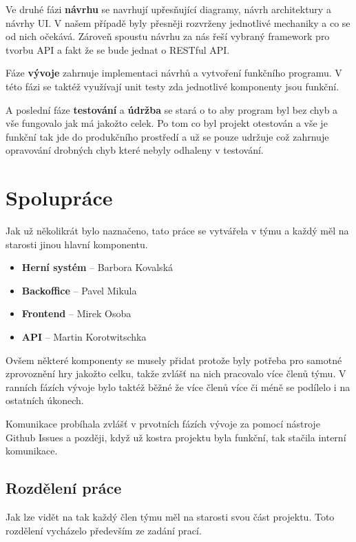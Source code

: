 Ve druhé fázi \textbf{návrhu} se navrhují upřesňující diagramy, návrh architektury a návrhy UI. V našem případě byly přesněji rozvrženy jednotlivé mechaniky a co se od nich očekává. Zároveň spoustu návrhu za nás řeší vybraný framework pro tvorbu API a fakt že se bude jednat o RESTful API. 

Fáze \textbf{vývoje} zahrnuje implementaci návrhů a vytvoření funkčního programu. V této fázi se taktéž využívají unit testy zda jednotlivé komponenty jsou funkční. 

A poslední fáze \textbf{testování} a \textbf{údržba} se stará o to aby program byl bez chyb a vše fungovalo jak má jakožto celek. Po tom co byl projekt otestován a vše je funkční tak jde do produkčního prostředí a už se pouze udržuje což zahrnuje opravování drobných chyb které nebyly odhaleny v testování.

\section{Spolupráce}\label{sec:collaboration}
Jak už několikrát bylo naznačeno, tato práce se vytvářela v týmu a každý měl na starosti jinou hlavní komponentu.
\begin{itemize}[itemsep=0pt,parsep=0pt]
    \item \textbf{Herní systém} -- Barbora Kovalská
    \item \textbf{Backoffice} -- Pavel Mikula
    \item \textbf{Frontend} -- Mirek Osoba
    \item \textbf{API} -- Martin Korotwitschka
\end{itemize}

Ovšem některé komponenty se musely přidat protože byly potřeba pro samotné zprovoznění hry jakožto celku, takže zvlášť na nich pracovalo více členů týmu. V ranních fázích vývoje bylo taktéž běžné že více členů více či méně se podílelo i na ostatních úkonech. 

Komunikace probíhala zvlášť v prvotních fázích vývoje za pomocí nástroje Github Issues a později, když už kostra projektu byla funkční, tak stačila interní komunikace.  
\subsection{Rozdělení práce}\label{sec:collaboration:job_distribution}
Jak lze vidět na  tak každý člen týmu měl na starosti svou část projektu. Toto rozdělení vycházelo především ze zadání prací. 

